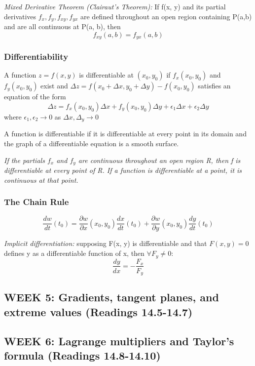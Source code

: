 \documentclass[12pt]{article}
\begin{document}
\emph{Mixed Derivative Theorem (Clairaut's Theorem):}
If f(x, y) and its partial derivatives $f_x, f_y, f_{xy}, f_{yx}$ are defined throughout an open region containing P(a,b) and are all continuous at P(a, b), then 
\[f_{xy} (a, b) = f_{yx} (a, b)\]

\subsubsection{Differentiability}
A function $z = f(x, y)$ is differentiable at $(x_0, y_0)$ if $f_x (x_0, y_0)$ and $f_y (x_0, y_0)$ exist and $\Delta z = f(x_0 + \Delta x, y_0 + \Delta y) - f(x_0, y_0)$ satisfies an equation of the form 
\[\Delta z = f_x (x_0, y_0) \Delta x + f_y (x_0, y_0) \Delta y + \epsilon_1 \Delta x + \epsilon_2 \Delta y\]
where $\epsilon_1, \epsilon_2 \to 0$ as $\Delta x, \Delta_y \to 0$

A function is differentiable if it is differentiable at every point in its domain and the graph of a differentiable equation is a smooth surface.

\emph{If the partials $f_x$ and $f_y$ are continuous throughout an open region R, then f is differentiable at every point of R. If a function is differentiable at a point, it is continuous at that point.}

\subsubsection{The Chain Rule}
\[\frac{dw}{dt}(t_0) = \frac{\partial w}{\partial x}(x_0, y_0) \frac{dx}{dt}(t_0) + \frac{\partial w}{\partial y}(x_0, y_0) \frac{dy}{dt}(t_0)\]

\emph{Implicit differentiation:} supposing F(x, y) is differentiable and that $F(x, y) = 0$ defines y as a differentiable function of x, then $\forall F_y \neq 0$:
\[ \frac{dy}{dx} = -\frac{F_x}{F_y}\]
\subsection{WEEK 5: Gradients, tangent planes, and extreme values (Readings 14.5-14.7)}

\subsection{WEEK 6: Lagrange multipliers and Taylor's formula (Readings 14.8-14.10)}
\end{document}
